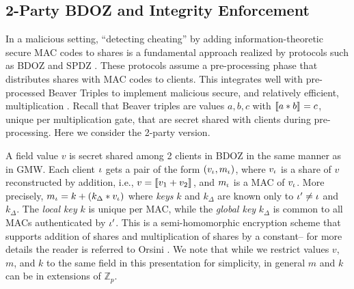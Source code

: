 \subsection{2-Party BDOZ and Integrity Enforcement}
\label{section-example-bdoz}



In a malicious setting, ``detecting cheating'' by adding
information-theoretic secure MAC codes to shares is a fundamental
approach realized by protocols such as BDOZ and SPDZ
\cite{SPDZ1,SPDZ2,BDOZ,10.1007/978-3-030-68869-1_3}.  These protocols
assume a pre-processing phase that distributes shares with MAC codes
to clients.  This integrates well with pre-processed Beaver Triples to
implement malicious secure, and relatively efficient, multiplication
\cite{evans2018pragmatic}. Recall that Beaver triples are values $a,b,c$ with
$\llbracket a * b \rrbracket_{} = c$, unique per multiplication gate, that are secret
shared with clients during pre-processing. Here we consider the
2-party version.

A field value $v$ is secret shared among 2 clients in BDOZ in the same
manner as in GMW.  Each client $\iota$ gets a pair of the form
$(v_\iota,m_\iota)$, where $v_\iota$ is a share of $v$ reconstructed by
addition, i.e., $v = \llbracket v_1 + v_2 \rrbracket_{}$, and $m_\iota$ is a MAC of
$v_\iota$.  More precisely, $m_\iota = k + (k_\Delta * v_\iota)$ where
\emph{keys} $k$ and $k_\Delta$ are known only to $\iota' \ne \iota$ and
$k_\Delta$. The \emph{local key} $k$ is unique per MAC, while the
\emph{global key} $k_\Delta$ is common to all MACs authenticated by
$\iota'$. This is a semi-homomorphic encryption scheme that supports
addition of shares and multiplication of shares by a constant-- for
more details the reader is referred to Orsini
\cite{10.1007/978-3-030-68869-1_3}. We note that while we restrict
values $v$, $m$, and $k$ to the same field in this presentation for
simplicity, in general $m$ and $k$ can be in extensions of
$\mathbb{Z}_p$.

